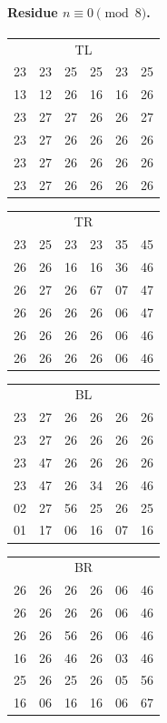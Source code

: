 \paragraph{Residue $n\equiv 0\pmod 8$.}
\begin{center}\scriptsize\ttfamily
\begin{tabular}[t]{@{}c@{\,}c@{\,}c@{\,}c@{\,}c@{\,}c@{}}\multicolumn{6}{c}{\normalfont\scriptsize TL}\\
23 & 23 & 25 & 25 & 23 & 25\\
13 & 12 & 26 & 16 & 16 & 26\\
23 & 27 & 27 & 26 & 26 & 27\\
23 & 27 & 26 & 26 & 26 & 26\\
23 & 27 & 26 & 26 & 26 & 26\\
23 & 27 & 26 & 26 & 26 & 26\end{tabular}\qquad
\begin{tabular}[t]{@{}c@{\,}c@{\,}c@{\,}c@{\,}c@{\,}c@{}}\multicolumn{6}{c}{\normalfont\scriptsize TR}\\
23 & 25 & 23 & 23 & 35 & 45\\
26 & 26 & 16 & 16 & 36 & 46\\
26 & 27 & 26 & 67 & 07 & 47\\
26 & 26 & 26 & 26 & 06 & 47\\
26 & 26 & 26 & 26 & 06 & 46\\
26 & 26 & 26 & 26 & 06 & 46\end{tabular}\qquad
\begin{tabular}[t]{@{}c@{\,}c@{\,}c@{\,}c@{\,}c@{\,}c@{}}\multicolumn{6}{c}{\normalfont\scriptsize BL}\\
23 & 27 & 26 & 26 & 26 & 26\\
23 & 27 & 26 & 26 & 26 & 26\\
23 & 47 & 26 & 26 & 26 & 26\\
23 & 47 & 26 & 34 & 26 & 46\\
02 & 27 & 56 & 25 & 26 & 25\\
01 & 17 & 06 & 16 & 07 & 16\end{tabular}\qquad
\begin{tabular}[t]{@{}c@{\,}c@{\,}c@{\,}c@{\,}c@{\,}c@{}}\multicolumn{6}{c}{\normalfont\scriptsize BR}\\
26 & 26 & 26 & 26 & 06 & 46\\
26 & 26 & 26 & 26 & 06 & 46\\
26 & 26 & 56 & 26 & 06 & 46\\
16 & 26 & 46 & 26 & 03 & 46\\
25 & 26 & 25 & 26 & 05 & 56\\
16 & 06 & 16 & 16 & 06 & 67\end{tabular}
\end{center}

